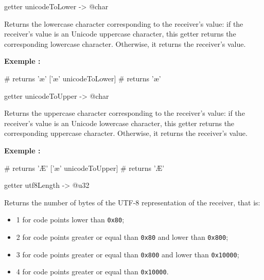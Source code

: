 
\begin{galgas4}
getter unicodeToLower -> @char
\end{galgas4}

Returns the lowercase character corresponding to the receiver's value: if the receiver's value is an Unicode uppercase character, this getter returns the corresponding lowercase character. Otherwise, it returns the receiver's value.

\textbf{Exemple :}
\begin{galgas4}
['Æ' unicodeToLower] # returns 'æ'
['æ' unicodeToLower] # returns 'æ'
\end{galgas4}





\begin{galgas4}
getter unicodeToUpper -> @char
\end{galgas4}

Returns the uppercase character corresponding to the receiver's value: if the receiver's value is an Unicode lowercase character, this getter returns the corresponding uppercase character. Otherwise, it returns the receiver's value.

\textbf{Exemple :}
\begin{galgas4}
['Æ' unicodeToUpper] # returns 'Æ'
['æ' unicodeToUpper] # returns 'Æ'
\end{galgas4}





\begin{galgas4}
getter utf8Length -> @u32
\end{galgas4}

Returns the number of bytes of the UTF-8 representation of the receiver, that is:
\begin{itemize}
  \item 1 for code points lower than \texttt{0x80};
  \item 2 for code points greater or equal than \texttt{0x80} and lower than \texttt{0x800};
  \item 3 for code points greater or equal than \texttt{0x800} and lower than \texttt{0x10000};
  \item 4 for code points greater or equal than \texttt{0x10000}.
\end{itemize}







